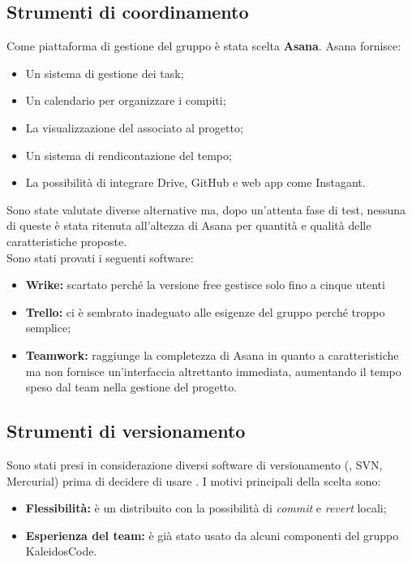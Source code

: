 \documentclass[../NormeDiProgetto.tex]{subfiles}
\begin{document}
		\subsection{Strumenti di coordinamento}
			Come piattaforma di gestione del gruppo è stata scelta \textbf{Asana}. Asana fornisce:
			\begin{itemize}
				\item Un sistema di gestione dei task;
				\item Un calendario per organizzare i compiti;
				\item La visualizzazione del  associato al progetto;
				\item Un sistema di rendicontazione del tempo;
				\item La possibilità di integrare Drive, GitHub e web app come Instagant.
			\end{itemize}
			Sono state valutate diverse alternative ma, dopo un'attenta fase di test, nessuna di queste è stata ritenuta all'altezza di Asana per quantità e qualità delle caratteristiche proposte. \\
			Sono stati provati i seguenti software:
			\begin{itemize}
				\item \textbf{Wrike:} scartato perché la versione free gestisce solo fino a cinque utenti
				\item \textbf{Trello:} ci è sembrato inadeguato alle esigenze del gruppo perché troppo semplice; %
				\item \textbf{Teamwork:} raggiunge la completezza di Asana in quanto a caratteristiche ma non fornisce un'interfaccia altrettanto immediata, aumentando il tempo speso dal team nella gestione del progetto.
			\end{itemize}
		\subsection{Strumenti di versionamento}
			Sono stati presi in considerazione diversi software di versionamento (, SVN, Mercurial) prima di decidere di usare \textbf{}. I motivi principali della scelta sono: 
			\begin{itemize}
				\item \textbf{Flessibilità:}  è un  distribuito con la possibilità di \textit{commit} e \textit{revert} locali;
				\item \textbf{Esperienza del team:}  è già stato usato da alcuni componenti del gruppo KaleidosCode.
			\end{itemize}
\end{document}
